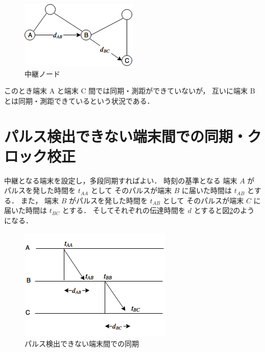 \begin{figure}[p]
  \centering
  \includegraphics[clip,width=1.05\hsize]{img/network_topology.png}
  \caption{中継ノード}\label{fig:nt}
\end{figure}

このとき端末 A と端末 C 間では同期・測距ができていないが，
互いに端末 B とは同期・測距できているという状況である．



\section{パルス検出できない端末間での同期・クロック校正}

中継となる端末を設定し，多段同期すればよい．
時刻の基準となる
端末 $A$ がパルスを発した時間を $t_{AA}$ として
そのパルスが端末 $B$ に届いた時間は $t_{AB}$ とする．
また，
端末 $B$ がパルスを発した時間を $t_{AB}$ として
そのパルスが端末 $C$ に届いた時間は $t_{BC}$ とする．
そしてそれぞれの伝達時間を $d$ とすると図\ref{fig:rd}のようになる．


\begin{figure}[p]
  \centering
  \includegraphics[clip,width=1.05\hsize]{img/rel_delay.png}
  \caption{パルス検出できない端末間での同期}\label{fig:rd}
\end{figure}

